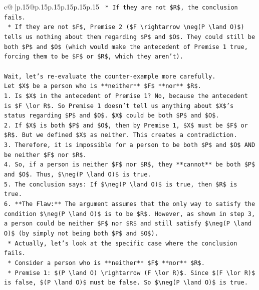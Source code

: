 \documentclass{article}
\begin{document}
{\begin{supertabular}{c@{$\;$}|p{.15\linewidth}@{}p{.15\linewidth}p{.15\linewidth}p{.15\linewidth}p{.15\linewidth}p{.15\linewidth}}
{{{\texttt{    *   If they are not \$R\$, the conclusion fails.} \\
\texttt{    *   If they are not \$F\$, Premise 2 (\$F \textbackslash{}rightarrow \textbackslash{}neg(P \textbackslash{}land O)\$) tells us nothing about them regarding \$P\$ and \$O\$. They could still be both \$P\$ and \$O\$ (which would make the antecedent of Premise 1 true, forcing them to be \$F\$ or \$R\$, which they aren't).} \\
\\ 
\texttt{Wait, let's re{-}evaluate the counter{-}example more carefully.} \\
\texttt{Let \$X\$ be a person who is **neither** \$F\$ **nor** \$R\$.} \\
\texttt{1.  Is \$X\$ in the antecedent of Premise 1? No, because the antecedent is \$F \textbackslash{}lor R\$. So Premise 1 doesn't tell us anything about \$X\$'s status regarding \$P\$ and \$O\$. \$X\$ could be both \$P\$ and \$O\$.} \\
\texttt{2.  If \$X\$ is both \$P\$ and \$O\$, then by Premise 1, \$X\$ must be \$F\$ or \$R\$. But we defined \$X\$ as neither. This creates a contradiction.} \\
\texttt{3.  Therefore, it is impossible for a person to be both \$P\$ and \$O\$ AND be neither \$F\$ nor \$R\$.} \\
\texttt{4.  So, if a person is neither \$F\$ nor \$R\$, they **cannot** be both \$P\$ and \$O\$. Thus, \$\textbackslash{}neg(P \textbackslash{}land O)\$ is true.} \\
\texttt{5.  The conclusion says: If \$\textbackslash{}neg(P \textbackslash{}land O)\$ is true, then \$R\$ is true.} \\
\texttt{6.  **The Flaw:** The argument assumes that the only way to satisfy the condition \$\textbackslash{}neg(P \textbackslash{}land O)\$ is to be \$R\$. However, as shown in step 3, a person could be neither \$F\$ nor \$R\$ and still satisfy \$\textbackslash{}neg(P \textbackslash{}land O)\$ (by simply not being both \$P\$ and \$O\$).} \\
\texttt{    *   Actually, let's look at the specific case where the conclusion fails.} \\
\texttt{    *   Consider a person who is **neither** \$F\$ **nor** \$R\$.} \\
\texttt{    *   Premise 1: \$(P \textbackslash{}land O) \textbackslash{}rightarrow (F \textbackslash{}lor R)\$. Since \$(F \textbackslash{}lor R)\$ is false, \$(P \textbackslash{}land O)\$ must be false. So \$\textbackslash{}neg(P \textbackslash{}land O)\$ is true.} \\
}}}
\end{supertabular}}
\end{document}
